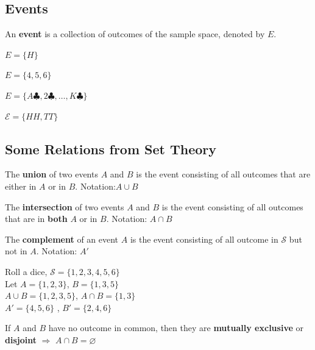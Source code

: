 \subsection{Events}
\begin{defn}
  An \textbf{event} is a collection of outcomes of the sample space, denoted by $E$.
\end{defn}

\begin{exmp}
  $E=\{H\}$
\end{exmp}

\begin{exmp}
  $E=\{4,5,6\}$
\end{exmp}

\begin{exmp}
  $E=\{A\clubsuit,2\clubsuit,\dots,K\clubsuit\}$
\end{exmp}

\begin{exmp}
  $\mathcal{E}=\{HH,TT\}$
\end{exmp}

\subsection{Some Relations from Set Theory}
\begin{defn}
  The \textbf{union} of two events $A$ and $B$ is the event consisting of all outcomes that are either in $A$ or in $B$. Notation:$A\cup B$
\end{defn}

\begin{defn}
  The \textbf{intersection} of two events $A$ and $B$ is the event consisting of all outcomes that are in \textbf{both} $A$ or in $B$. Notation: $A \cap B$
\end{defn}

\begin{defn}
  The \textbf{complement} of an event  $A$ is the event consisting of all outcome in $\mathcal{S}$ but not in $A$. Notation: $A'$
\end{defn}


\begin{exmp}
  Roll a dice, $\mathcal{S}=\{1,2,3,4,5,6 \}$\\
  Let $A=\{1,2,3\}$, $B=\{1,3,5\}$\\
  $A\cup B=\{1,2,3,5\}$, $A \cap B=\{1,3\}$\\
  $A'=\{4,5,6\}$ , $B'=\{2,4,6\}$
\end{exmp}

\begin{defn}
  If $A$ and $B$ have no outcome in common, then they are \textbf{mutually exclusive} or \textbf{disjoint} $\Rightarrow$ $A\cap B=\varnothing$
\end{defn}

